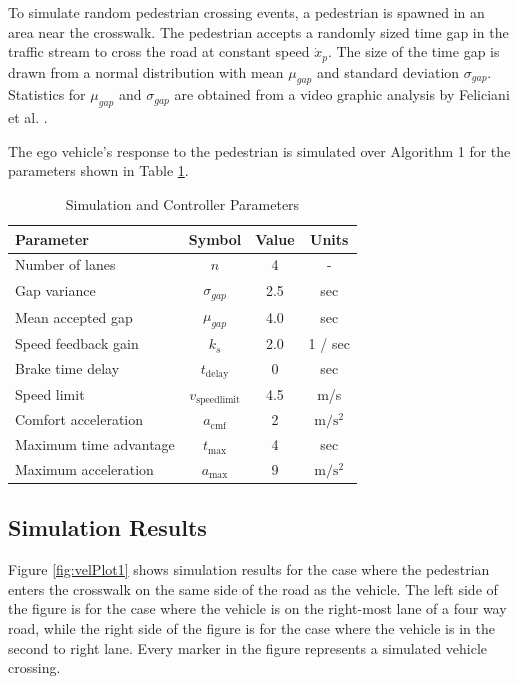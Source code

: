 \documentclass[letterpaper, 10 pt, conference]{ieeeconf}  %
\begin{document}
To simulate random pedestrian crossing events, a pedestrian is spawned in an area near the crosswalk. The pedestrian accepts a randomly sized time gap in the traffic stream to cross the road at constant speed $\dot{x}_p$. The size of the time gap is drawn from a normal distribution with mean $\mu_{gap}$ and standard deviation $\sigma_{gap}$. Statistics for $\mu_{gap}$ and $\sigma_{gap}$ are obtained from a video graphic analysis by Feliciani et al. \cite{Feliciani2017}. 

The ego vehicle's response to the pedestrian is simulated over Algorithm 1 for the parameters shown in Table \ref{tb:params}.  

\begin{table}[h]
\footnotesize
\begin{center}
\caption{Simulation and Controller Parameters}\label{tb:params}
\begin{tabular}{lccc}
Parameter & Symbol & Value & Units \\\hline\hline
Number of lanes & $n$ & 4 & - \\
Gap variance & $\sigma_{gap}$ & 2.5 & sec\\
Mean accepted gap & $\mu_{gap}$ & 4.0 & sec\\\hline
Speed feedback gain & $k_s$ & 2.0 & 1 / sec\\
Brake time delay    & $t_\mathrm{delay}$ & 0 & sec \\ 
Speed limit & $v_\mathrm{speedlimit}$ & 4.5 & m/s \\
Comfort acceleration & $a_\mathrm{cmf}$ & 2 & $\mathrm{m/s^2}$ \\
Maximum time advantage & $t_\mathrm{max}$ & 4 & sec \\
Maximum acceleration & $a_\mathrm{max}$ & 9 & $\mathrm{m/s^2}$ \\\hline
\end{tabular}
\end{center}
\end{table}

\subsection{Simulation Results}

Figure \ref{fig:velPlot1} shows simulation results for the case where the pedestrian enters the crosswalk on the same side of the road as the vehicle. The left side of the figure is for the case where the vehicle is on the right-most lane of a four way road, while the right side of the figure is for the case where the vehicle is in the second to right lane. Every marker in the figure represents a simulated vehicle crossing.
\end{document}
